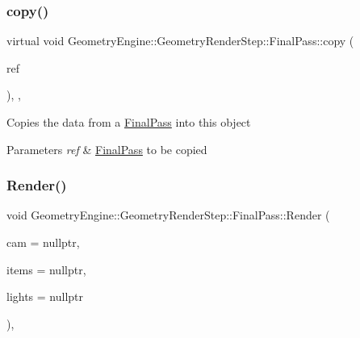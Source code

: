 \subsubsection{\texorpdfstring{copy()}{copy()}}
{\footnotesize\ttfamily virtual void Geometry\+Engine\+::\+Geometry\+Render\+Step\+::\+Final\+Pass\+::copy (\begin{DoxyParamCaption}\item[{const \mbox{\hyperlink{class_geometry_engine_1_1_geometry_render_step_1_1_final_pass}{Final\+Pass}} \&}]{ref }\end{DoxyParamCaption})\hspace{0.3cm}{\ttfamily [inline]}, {\ttfamily [protected]}, {\ttfamily [virtual]}}

Copies the data from a \mbox{\hyperlink{class_geometry_engine_1_1_geometry_render_step_1_1_final_pass}{Final\+Pass}} into this object 
\begin{DoxyParams}{Parameters}
{\em ref} & \mbox{\hyperlink{class_geometry_engine_1_1_geometry_render_step_1_1_final_pass}{Final\+Pass}} to be copied \\
\hline
\end{DoxyParams}
\mbox{\label{class_geometry_engine_1_1_geometry_render_step_1_1_final_pass_ad078d0e9d394754dbbd3cff871d72b9f}} 
\subsubsection{\texorpdfstring{Render()}{Render()}}
{\footnotesize\ttfamily void Geometry\+Engine\+::\+Geometry\+Render\+Step\+::\+Final\+Pass\+::\+Render (\begin{DoxyParamCaption}\item[{\mbox{\hyperlink{class_geometry_engine_1_1_geometry_world_item_1_1_geometry_camera_1_1_camera}{Geometry\+World\+Item\+::\+Geometry\+Camera\+::\+Camera}} $\ast$}]{cam = {\ttfamily nullptr},  }\item[{std\+::unordered\+\_\+set$<$ \mbox{\hyperlink{class_geometry_engine_1_1_geometry_world_item_1_1_geometry_item_1_1_geometry_item}{Geometry\+World\+Item\+::\+Geometry\+Item\+::\+Geometry\+Item}} $\ast$ $>$ $\ast$}]{items = {\ttfamily nullptr},  }\item[{std\+::unordered\+\_\+set$<$ \mbox{\hyperlink{class_geometry_engine_1_1_geometry_world_item_1_1_geometry_light_1_1_light}{Geometry\+World\+Item\+::\+Geometry\+Light\+::\+Light}} $\ast$ $>$ $\ast$}]{lights = {\ttfamily nullptr} }\end{DoxyParamCaption})\hspace{0.3cm}{\ttfamily [override]}, {\ttfamily [virtual]}}

